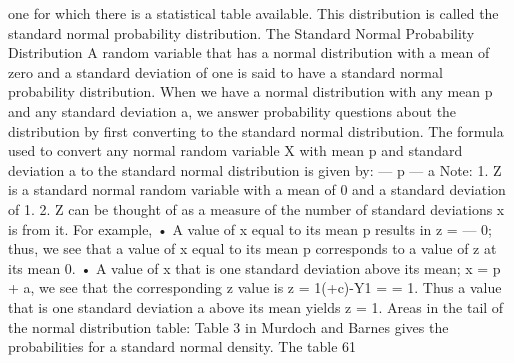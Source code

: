 one for which there is a statistical table available. This distribution is called the standard normal 
probability distribution. 
The Standard Normal Probability Distribution A random variable that has a normal distribution with a mean of zero and a standard deviation of one is said to have a standard normal probability distribution. When we have a normal distribution with any mean p and any standard deviation a, we answer probability questions about the distribution by first converting to the standard normal distribution. The formula used to convert any normal random variable X with mean p and standard deviation a to the standard normal distribution is given by: 
— p —  a 
Note: 1. Z is a standard normal random variable with a mean of 0 and a standard deviation of 1. 2. Z can be thought of as a measure of the number of standard deviations x is from it. 
For example, 
• A value of x equal to its mean p results in z = — 0; thus, we see that a value of x equal 
to its mean p corresponds to a value of z at its mean 0. 
• A value of x that is one standard deviation above its mean; x = p + a, we see that the 
corresponding z value is z = 1(+c)-Y1 = = 1. Thus a value that is one standard deviation a 
above its mean yields z = 1. 
Areas in the tail of the normal distribution table: 
Table 3 in Murdoch and Barnes gives the probabilities for a standard normal density. The table 
61 
